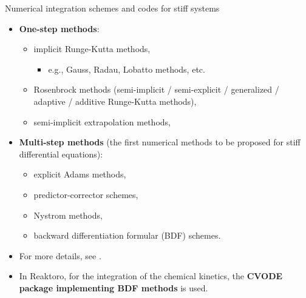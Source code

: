 \begin{frame}{Numerical integration schemes and codes for stiff systems}

\begin{itemize}

\item \alert{\bf One-step methods}:
%
\begin{itemize}
	\item implicit Runge-Kutta methods,
	\begin{itemize}
		\item e.g., Gauss, Radau, Lobatto methods, etc.
	\end{itemize}
	\item Rosenbrock methods (semi-implicit / semi-explicit / generalized / adaptive / additive Runge-Kutta methods),
	\item semi-implicit extrapolation methods, 
\end{itemize}
%
\item \alert{\bf Multi-step methods} (the first numerical methods to be proposed for stiff differential equations):
%
\begin{itemize}
	\item explicit Adams methods,
	\item predictor-corrector schemes,
	\item Nystrom methods, 
	\item backward differentiation formular (BDF) schemes.
\end{itemize}
%
\item For more details, see \cite{Hairer2010}.
%
\item In Reaktoro, for the integration of the chemical kinetics, the {\bf CVODE package implementing BDF methods} \cite{Cohen1996, Hindmarsh2005} is used. 
\end{itemize}

\end{frame}
%
%
